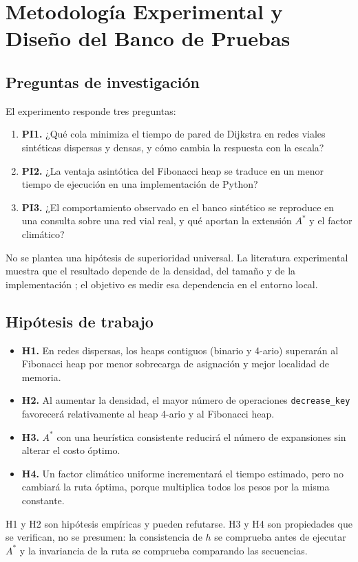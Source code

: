 \section{Metodología Experimental y Diseño del Banco de Pruebas}
\label{sec:metodologia}

\subsection{Preguntas de investigación}
El experimento responde tres preguntas:
\begin{enumerate}
    \item \textbf{PI1.} ¿Qué cola minimiza el tiempo de pared de Dijkstra en redes viales sintéticas dispersas y densas, y cómo cambia la respuesta con la escala?
    \item \textbf{PI2.} ¿La ventaja asintótica del Fibonacci heap se traduce en un menor tiempo de ejecución en una implementación de Python?
    \item \textbf{PI3.} ¿El comportamiento observado en el banco sintético se reproduce en una consulta sobre una red vial real, y qué aportan la extensión $A^*$ y el factor climático?
\end{enumerate}
No se plantea una hipótesis de superioridad universal. La literatura experimental muestra que el resultado depende de la densidad, del tamaño y de la implementación \parencite{cherkassky1996shortest,lamarca1996cache}; el objetivo es medir esa dependencia en el entorno local.

\subsection{Hipótesis de trabajo}
\begin{itemize}
    \item \textbf{H1.} En redes dispersas, los heaps contiguos (binario y 4-ario) superarán al Fibonacci heap por menor sobrecarga de asignación y mejor localidad de memoria.
    \item \textbf{H2.} Al aumentar la densidad, el mayor número de operaciones \texttt{decrease\_key} favorecerá relativamente al heap 4-ario y al Fibonacci heap.
    \item \textbf{H3.} $A^*$ con una heurística consistente reducirá el número de expansiones sin alterar el costo óptimo.
    \item \textbf{H4.} Un factor climático uniforme incrementará el tiempo estimado, pero no cambiará la ruta óptima, porque multiplica todos los pesos por la misma constante.
\end{itemize}
H1 y H2 son hipótesis empíricas y pueden refutarse. H3 y H4 son propiedades que se verifican, no se presumen: la consistencia de $h$ se comprueba antes de ejecutar $A^*$ y la invariancia de la ruta se comprueba comparando las secuencias.

